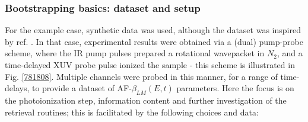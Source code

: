 

\subsubsection{Bootstrapping basics: dataset and setup}

For the example case, synthetic data was used, although the dataset was inspired by ref. \cite{marceau2017MolecularFrameReconstruction}. In that case, experimental results were obtained via a (dual) pump-probe scheme, where the IR pump pulses prepared a rotational wavepacket in $N_2$, and a time-delayed XUV probe pulse ionized the sample - this scheme is illustrated in Fig. \ref{781808}. Multiple channels were probed in this manner, for a range of time-delays, to provide a dataset of AF-$\beta_{LM}(E,t)$ parameters. Here the focus is on the photoionization step, information content and further investigation of the retrieval routines; this is facilitated by the following choices and data:

